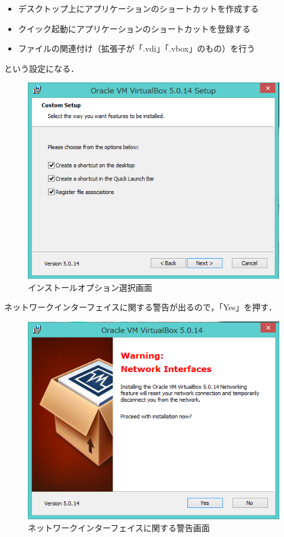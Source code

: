 \begin{itemize}
	\item デスクトップ上にアプリケーションのショートカットを作成する
	\item クイック起動にアプリケーションのショートカットを登録する
	\item ファイルの関連付け（拡張子が「.vdi」「.vbox」のもの）を行う
\end{itemize}

という設定になる．

\begin{figure}[H]
\centering
\includegraphics[width=13cm]{vboxinstall_option.PNG}
\caption{インストールオプション選択画面}\label{vboxinstalloption}
\end{figure}

ネットワークインターフェイスに関する警告が出るので，「Yes」を押す．

\begin{figure}[H]
\centering
\includegraphics[width=13cm]{vboxinstall_network.PNG}
\caption{ネットワークインターフェイスに関する警告画面}\label{vboxinstallnetwork}
\end{figure}

